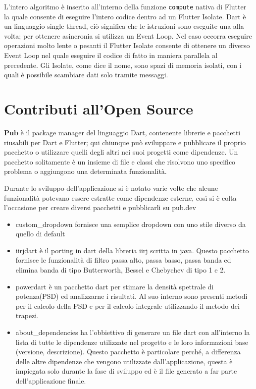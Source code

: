 L'intero algoritmo è inserito all'interno della funzione \texttt{compute} nativa di Flutter la quale consente di eseguire l'intero codice dentro ad un Flutter Isolate. Dart è un linguaggio single thread, ciò significa che le istruzioni sono eseguite una alla volta; per ottenere asincronia si utilizza un Event Loop. Nel caso occorra eseguire operazioni molto lente o pesanti il Flutter Isolate consente di ottenere un diverso Event Loop nel quale eseguire il codice di fatto in maniera parallela al precedente. Gli Isolate, come dice il nome, sono spazi di memoria isolati, con i quali è possibile scambiare dati solo tramite messaggi.

\section{Contributi all'Open Source}

{\bfseries Pub} è il package manager del linguaggio Dart, contenente librerie e pacchetti riusabili per Dart e Flutter; qui chiunque può sviluppare e pubblicare il proprio pacchetto o utilizzare quelli degli altri nei suoi progetti come dipendenze. Un pacchetto solitamente è un insieme di file e classi che risolvono uno specifico problema o aggiungono una determinata funzionalità.

Durante lo sviluppo dell'applicazione si è notato varie volte che alcune funzionalità potevano essere estratte come dipendenze esterne, così si è colta l'occasione per creare diversi pacchetti e pubblicarli su pub.dev 
\begin{itemize}
  \item custom\_dropdown\cite{cudropdown} fornisce una semplice dropdown con uno stile diverso da quello di default
  \item iirjdart\cite{iirjdart} è il porting in dart della libreria iirj scritta in java. Questo pacchetto fornisce le funzionalità di filtro passa alto, passa basso, passa banda ed elimina banda di tipo Butterworth, Bessel e Chebychev di tipo 1 e 2.
  \item powerdart\cite{powerdart} è un pacchetto dart per stimare la densità spettrale di potenza(PSD) ed analizzarne i risultati. Al suo interno sono presenti metodi per il calcolo della PSD e per il calcolo integrale utilizzando il metodo dei trapezi.
  \item about\_dependencies\cite{abtdependencies} ha l'obbiettivo di generare un file dart con all'interno la lista di tutte le dipendenze utilizzate nel progetto e le loro informazioni base (versione, descrizione). Questo pacchetto è particolare perché, a differenza delle altre dipendenze che vengono utilizzate dall'applicazione, questa è impiegata solo durante la fase di sviluppo ed è il file generato a far parte dell'applicazione finale.
\end{itemize}